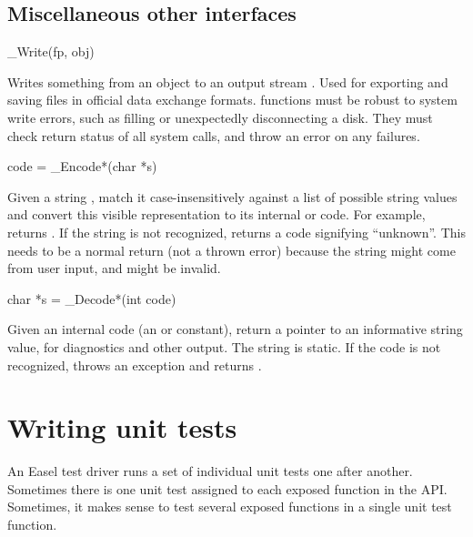 \subsection{Miscellaneous other interfaces}

\begin{sreapi}
\hypertarget{ifc:Write}
{\item[\_Write(fp, obj)]}
Writes something from an object to an output stream . Used
for exporting and saving files in official data exchange formats.
 functions must be robust to system write errors,
such as filling or unexpectedly disconnecting a disk. They must check
return status of all system calls, and throw an 
error on any failures.




\hypertarget{ifc:Encode}
{\item[code = \_Encode*(char *s)]}

Given a string , match it case-insensitively against a list
of possible string values and convert this visible representation to
its internal  or  code. For example,
 returns
. If the string is not recognized, returns a
code signifying ``unknown''. This needs to be a normal return (not a
thrown error) because the string might come from user input, and might
be invalid.


\hypertarget{ifc:Decode}
{\item[char *s = \_Decode*(int code)]}

Given an internal code (an  or  constant),
return a pointer to an informative string value, for diagnostics and
other output. The string is static. If the code is not recognized,
throws an  exception and returns .

\end{sreapi}






\section{Writing unit tests}

An Easel test driver runs a set of individual unit tests one after
another.  Sometimes there is one unit test assigned to each exposed
function in the API. Sometimes, it makes sense to test several exposed
functions in a single unit test function.

